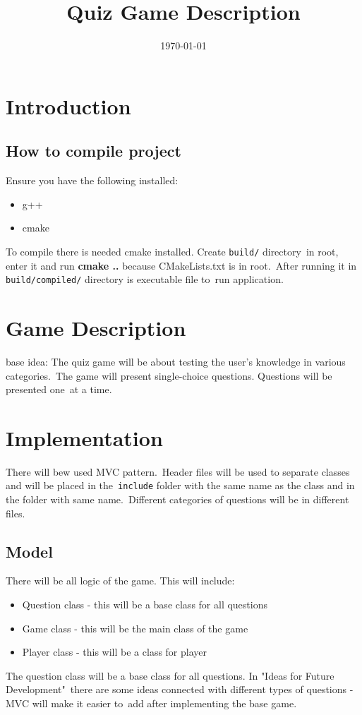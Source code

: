 \documentclass[a4paper,12pt]{article}
\title{Quiz Game Description}
\date{\today}
\begin{document}
\maketitle

\section{Introduction}
\subsection{How to compile project}
Ensure you have the following installed:
\begin{itemize}
    \item g++
    \item cmake
\end{itemize}

To compile there is needed cmake installed. Create \texttt{build/} directory\
in root, enter it and run \textbf{cmake ..} because CMakeLists.txt is in root.\
After running it in \texttt{build/compiled/} directory is executable file to\
run application.

\section{Game Description}
base idea:
The quiz game will be about testing the user's knowledge in various categories.\
The game will present single-choice questions. Questions will be presented one\
at a time.

\section{Implementation}
There will bew used MVC pattern.\
Header files will be used to separate classes and will be placed in the\
\texttt{include} folder with the same name as the class and in the folder with same name.\
Different categories of questions will be in different files.
\subsection{Model}
There will be all logic of the game. This will include:
\begin{itemize}
    \item Question class - this will be a base class for all questions
    \item Game class - this will be the main class of the game
    \item Player class - this will be a class for player
\end{itemize}
The question class will be a base class for all questions. In "Ideas for Future Development"\
there are some ideas connected with different types of questions - MVC will make it easier to\
add after implementing the base game.
\end{document}
